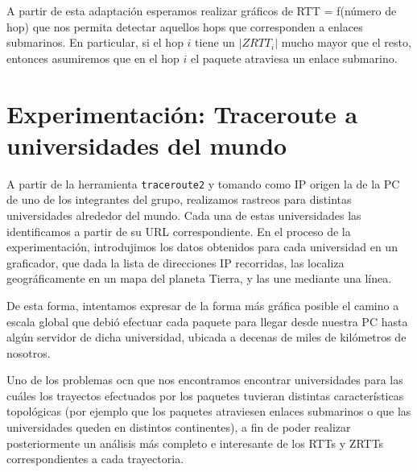 \documentclass[final,inline,a4paper,narroweqnarray]{ieee}
\let\Oldsection\section
\renewcommand{\section}{\FloatBarrier\Oldsection}
\begin{document}
  A partir de esta adaptación esperamos realizar gráficos de RTT = f(número de hop) que 
  nos permita detectar aquellos hops que corresponden a enlaces submarinos. En particular,
  si el hop $i$ tiene un $|ZRTT_i|$ mucho mayor que el resto, entonces asumiremos que
  en el hop $i$ el paquete atraviesa un enlace submarino. 

\section{Experimentación: Traceroute a universidades del mundo}

A partir de la herramienta \texttt{traceroute2} y tomando como IP origen la de la PC de uno de los integrantes del grupo,
realizamos rastreos para distintas universidades alrededor del mundo. Cada una de estas universidades las identificamos
a partir de su URL correspondiente. 
En el proceso de la experimentación, introdujimos los datos obtenidos para cada universidad en un graficador, que 
dada la lista de direcciones IP recorridas, las localiza geográficamente en un mapa del planeta Tierra, 
y las une mediante una línea. 

De esta forma, intentamos expresar de la forma más gráfica posible el camino a 
escala global que debió efectuar cada paquete para llegar desde nuestra PC hasta algún servidor de dicha universidad, 
ubicada a decenas de miles de kilómetros de nosotros. 

Uno de los problemas ocn que nos encontramos encontrar universidades para las cuáles los trayectos efectuados por los paquetes 
tuvieran distintas características topológicas (por ejemplo que los paquetes atraviesen enlaces submarinos o que
las universidades queden en distintos continentes), a fin 
de poder realizar posteriormente un análisis más completo e interesante de los RTTs y ZRTTs
correspondientes a cada trayectoria.  
\end{document}
